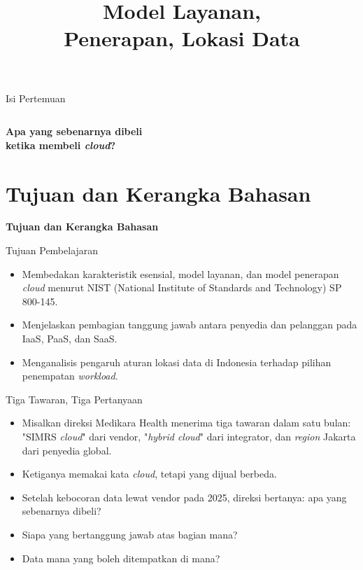 \documentclass[aspectratio=169, table, 12pt]{beamer}
\title{\Huge Model Layanan,\\ \vspace{10pt} Penerapan, Lokasi Data}
\begin{document}
\frame{\titlepage}

\begin{frame}{Isi Pertemuan}
  \vspace{10pt}
  \begin{columns}[t]
    {\small\tableofcontents[sections={1-4}]}

    {\small\tableofcontents[sections={5-8}]}
  \end{columns}
\end{frame}

\begin{frame}{\hfill}
  \centering
  \Huge{\textbf{Apa yang sebenarnya dibeli\\ketika membeli \textit{cloud}?}}
\end{frame}

\section{Tujuan dan Kerangka Bahasan}

\begin{frame}{\hfill}
  \centering
  \Huge{\textbf{Tujuan dan Kerangka Bahasan}}
\end{frame}

\begin{frame}{Tujuan Pembelajaran}
  \vspace{6pt}
  \begin{itemize}
    \item Membedakan karakteristik esensial, model layanan, dan model penerapan
          \textit{cloud} menurut NIST (National Institute of Standards and Technology)
          SP 800-145.
    \item Menjelaskan pembagian tanggung jawab antara penyedia dan pelanggan pada IaaS,
          PaaS, dan SaaS.
    \item Menganalisis pengaruh aturan lokasi data di Indonesia terhadap pilihan
          penempatan \textit{workload}.
  \end{itemize}
\end{frame}

\begin{frame}{Tiga Tawaran, Tiga Pertanyaan}
  \small
  \begin{itemize}
    \item Misalkan direksi Medikara Health menerima tiga tawaran dalam satu bulan:
          "SIMRS \textit{cloud}" dari vendor, "\textit{hybrid cloud}" dari integrator,
          dan \textit{region} Jakarta dari penyedia global.
    \item Ketiganya memakai kata \textit{cloud}, tetapi yang dijual berbeda.
    \item Setelah kebocoran data lewat vendor pada 2025, direksi bertanya: apa yang
          sebenarnya dibeli?
    \item Siapa yang bertanggung jawab atas bagian mana?
    \item Data mana yang boleh ditempatkan di mana?
  \end{itemize}
\end{frame}
\end{document}
